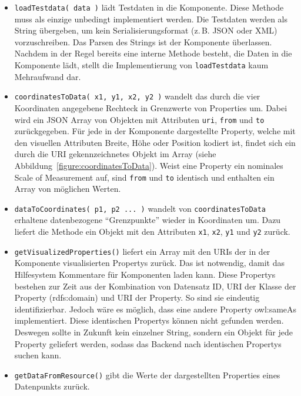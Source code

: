 \documentclass[
	headsepline,
	footsepline,
	fontsize=12pt,
	bibliography=totoc
]{scrbook}
\begin{document}
\begin{itemize}
	\item \texttt{loadTestdata( data )} lädt Testdaten in die Komponente. Diese Methode muss als einzige unbedingt implementiert werden. Die Testdaten werden als String übergeben, um kein Serialisierungsformat (z.\,B. JSON oder XML) vorzuschreiben. Das Parsen des Strings ist der Komponente überlassen. Nachdem in der Regel bereits eine interne Methode besteht, die Daten in die Komponente lädt, stellt die Implementierung von \texttt{loadTestdata} kaum Mehraufwand dar.
	\item \texttt{coordinatesToData( x1, y1, x2, y2 )} wandelt das durch die vier Koordinaten angegebene Rechteck in Grenzwerte von Properties um. Dabei wird ein JSON Array von Objekten mit Attributen \texttt{uri}, \texttt{from} und \texttt{to} zurückgegeben. Für jede in der Komponente dargestellte Property, welche mit den visuellen Attributen Breite, Höhe oder Position kodiert ist, findet sich ein durch die URI gekennzeichnetes Objekt im Array (siehe Abbildung~\ref{figure:coordinatesToData}). Weist eine Property ein nominales Scale of Measurement auf, sind \texttt{from} und \texttt{to} identisch und enthalten ein Array von möglichen Werten.
	\item \texttt{dataToCoordinates( p1, p2 ... )} wandelt von \texttt{coordinatesToData} erhaltene datenbezogene \enquote{Grenzpunkte} wieder in Koordinaten um. Dazu liefert die Methode ein Objekt mit den Attributen \texttt{x1}, \texttt{x2}, \texttt{y1} und \texttt{y2} zurück.
	\item \texttt{getVisualizedProperties()} liefert ein Array mit den URIs der in der Komponente visualisierten Propertys zurück. Das ist notwendig, damit das Hilfesystem Kommentare für Komponenten laden kann. Diese Propertys bestehen zur Zeit aus der Kombination von Datensatz ID, URI der Klasse der Property (rdfs:domain) und URI der Property. So sind sie eindeutig identifizierbar. Jedoch wäre es möglich, dass eine andere Property owl:sameAs implementiert. Diese identischen Propertys können nicht gefunden werden. Deswegen sollte in Zukunft kein einzelner String, sondern ein Objekt für jede Property geliefert werden, sodass das Backend nach identischen Propertys suchen kann.
	\item \texttt{getDataFromResource()} gibt die Werte der dargestellten Properties eines Datenpunkts zurück.
\end{itemize}
\end{document}
